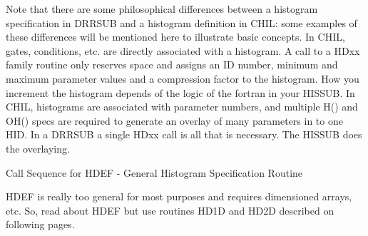    Note  that  there  are  some  philosophical differences between a histogram
   specification in DRRSUB and a histogram definition in CHIL:  some  examples
   of  these  differences will be mentioned here to illustrate basic concepts.
   In CHIL, gates, conditions, etc. are directly associated with a  histogram.
   A  call  to  a  HDxx  family  routine only reserves space and assigns an ID
   number, minimum and maximum parameter values and a  compression  factor  to
   the  histogram. How you increment the histogram depends of the logic of the
   fortran in your HISSUB. In CHIL, histograms are associated  with  parameter
   numbers,  and  multiple  H()  and  OH()  specs  are required to generate an
   overlay of many parameters in to one HID. In a DRRSUB a  single  HDxx  call
   is all that is necessary. The HISSUB does the overlaying.
 
   Call Sequence for HDEF -  General Histogram Specification Routine
 
   HDEF  is  really  too  general  for  most purposes and requires dimensioned
   arrays, etc. So, read about HDEF but use routines HD1D and  HD2D  described
   on following pages.
 
